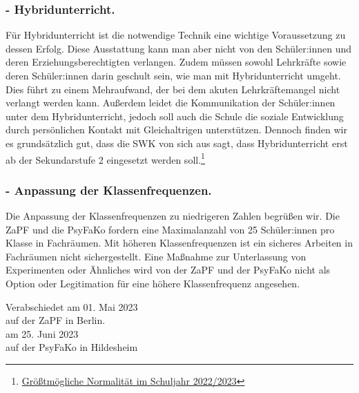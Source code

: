 \documentclass[DIV=calc]{scrartcl}
\begin{document}
\subsubsection*{- Hybridunterricht.}
Für Hybridunterricht ist die notwendige Technik eine wichtige Voraussetzung zu dessen Erfolg. Diese Ausstattung kann man aber nicht von den Schüler:innen und deren Erziehungsberechtigten verlangen. 
Zudem müssen sowohl Lehrkräfte sowie deren Schüler:innen darin geschult sein, wie man mit Hybridunterricht umgeht. Dies führt zu einem Mehraufwand, der bei dem akuten Lehrkräftemangel nicht verlangt werden kann. Außerdem leidet die Kommunikation der Schüler:innen unter dem Hybridunterricht, jedoch soll auch die Schule die soziale Entwicklung durch persönlichen Kontakt mit Gleichaltrigen unterstützen.
Dennoch finden wir es grundsätzlich gut, dass die SWK von sich aus sagt, dass Hybridunterricht erst ab der Sekundarstufe 2 eingesetzt werden soll.\footnote{\href{www.kmk.org/fileadmin/veroeffentlichungen_beschluesse/2022/2022_06_23-Umgang-mit-Covid19-Schuljahr-22-23.pdf}{Größtmögliche Normalität im Schuljahr 2022/2023}} %

\subsubsection*{- Anpassung der Klassenfrequenzen.}
Die Anpassung der Klassenfrequenzen zu niedrigeren Zahlen begrüßen wir. %
Die ZaPF und die PsyFaKo fordern eine Maximalanzahl von 25 Schüler:innen pro Klasse in Fachräumen. Mit höheren Klassenfrequenzen ist ein sicheres Arbeiten in Fachräumen nicht sichergestellt. Eine Maßnahme zur Unterlassung von Experimenten oder Ähnliches wird von der ZaPF und der PsyFaKo nicht als Option oder Legitimation für eine höhere Klassenfrequenz angesehen.

\vspace{1cm} 

\vfill
\begin{flushright}
	Verabschiedet am 01. Mai 2023 \\
	auf der ZaPF in Berlin.\\
 \vspace{0.2 cm}
    am 25. Juni 2023\\
    auf der PsyFaKo in Hildesheim \\
    
\end{flushright}
\end{document}
